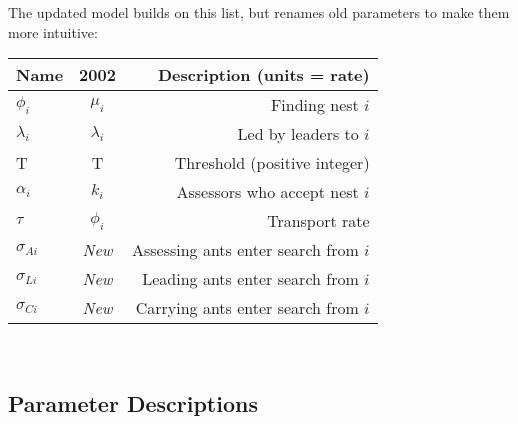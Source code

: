 \documentclass[letterpaper]{article}
\begin{document}
The updated model builds on this list, but renames old parameters to make them more intuitive: \\

\begin{tabular}{ l | c | r }
    \hline
  Name          & 2002        & Description (units = rate)\\ \hline
  $\phi_i$      & $\mu_i$     & Finding nest $i$\\
  $\lambda_i$   & $\lambda_i$ & Led by leaders to $i$\\
  T             & T           & Threshold (positive integer)\\
  $\alpha_i$    & $k_i$       & Assessors who accept nest $i$\\ \hline
  $\tau$        & $\phi_i$    & Transport rate \\
  $\sigma_{Ai}$ & \em{New}    & Assessing ants enter search from $i$\\
  $\sigma_{Li}$ & \em{New}    & Leading ants enter search from $i$\\
  $\sigma_{Ci}$ & \em{New}    & Carrying ants enter search from $i$\\
  \hline
\end{tabular} \\

\subsection{Parameter Descriptions} 
\end{document}
